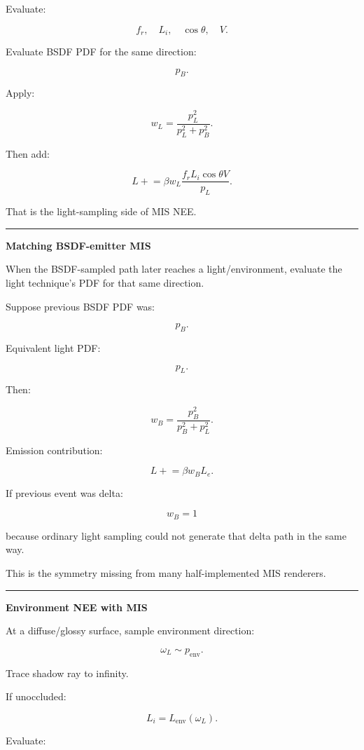 Evaluate:

\[
f_r,
\quad
L_i,
\quad
\cos\theta,
\quad
V.
\]

Evaluate BSDF PDF for the same direction:

\[
p_B.
\]

Apply:

\[
w_L=
\frac{p_L^2}{p_L^2+p_B^2}.
\]

Then add:

\[
\boxed{
L
\mathrel{+}=
\beta
w_L
\frac{
f_rL_i\cos\theta V
}{
p_L
}.
}
\]

That is the light-sampling side of MIS NEE.

\begin{center}\rule{0.5\linewidth}{0.5pt}\end{center}

\textbf{Matching BSDF-emitter MIS}

When the BSDF-sampled path later reaches a light/environment, evaluate the light technique's PDF for that same direction.

Suppose previous BSDF PDF was:

\[
p_B.
\]

Equivalent light PDF:

\[
p_L.
\]

Then:

\[
w_B
=
\frac{
p_B^2
}{
p_B^2+p_L^2
}.
\]

Emission contribution:

\[
\boxed{
L
\mathrel{+}=
\beta
w_B
L_e.
}
\]

If previous event was delta:

\[
w_B=1
\]

because ordinary light sampling could not generate that delta path in the same way.

This is the symmetry missing from many half-implemented MIS renderers.

\begin{center}\rule{0.5\linewidth}{0.5pt}\end{center}

\textbf{Environment NEE with MIS}

At a diffuse/glossy surface, sample environment direction:

\[
\omega_L
\sim
p_{\text{env}}.
\]

Trace shadow ray to infinity.

If unoccluded:

\[
L_i=
L_{\text{env}}(\omega_L).
\]

Evaluate:

